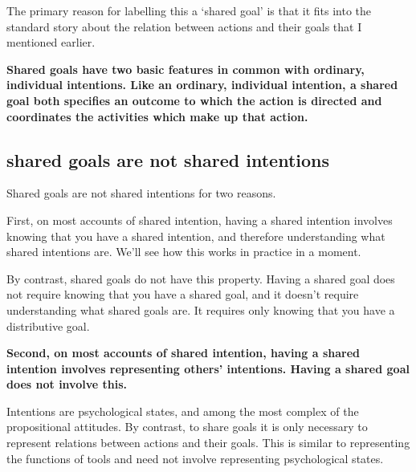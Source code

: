 \documentclass[14pt,a4paper]{extarticle}
\begin{document}
The primary reason for labelling this a `shared goal' is that it fits into the standard story about the relation between actions and their goals that I mentioned earlier.

\textbf{
Shared goals have two basic features in common with ordinary, individual intentions.  
Like an ordinary, individual intention, a shared goal both specifies an outcome to which the action is directed and coordinates the activities which make up that action.
}


\subsection{shared goals are not shared intentions}

Shared goals are not shared intentions for two reasons.

First, on most accounts of shared intention, having a shared intention involves knowing that you have a shared intention, and therefore understanding what shared intentions are.  We'll see how this works in practice in a moment.

By contrast, shared goals do not have this property.  Having a shared goal does not require knowing that you have a shared goal, and it doesn't require understanding what shared goals are.  It requires only knowing that you have a distributive goal.


\textbf{Second, on most accounts of shared intention, having a shared intention involves representing others' intentions.  Having a shared goal does not involve this.}

Intentions are psychological states, and among the most complex of the propositional attitudes.  By contrast, to share goals it is only necessary to represent relations between actions and their goals.  This is similar to representing the functions of tools and need not involve representing psychological states.
\end{document}
